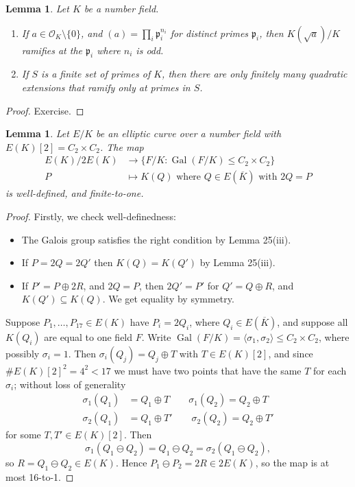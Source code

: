 \documentclass[a4paper]{article}
\theoremstyle{plain}
\newtheorem{lemma}[theorem]{Lemma}
\theoremstyle{remark}
\theoremstyle{definition}
\DeclareMathOperator{\Gal}{Gal}
\newcommand{\p}{\mathfrak{p}}
\renewcommand{\O}{\mathcal{O}}
\begin{document}
\begin{lemma}
    Let $K$ be a number field.
    \begin{enumerate}[label=(\roman*)]
        \item If $a\in\O_K\setminus\{0\}$, and $(a)=\prod_i\p_i^{n_i}$ for
            distinct primes $\p_i$, then $K(\sqrt a)/K$ ramifies at the $\p_i$
            where $n_i$ is odd.

        \item If $S$ is a finite set of primes of $K$, then there are only
            finitely many quadratic extensions that ramify only at primes in
            $S$.
    \end{enumerate}
\end{lemma}

\begin{proof}
    Exercise.
\end{proof}

\begin{lemma}
    Let $E/K$ be an elliptic curve over a number field with
    $E(K)[2]=C_2\times C_2$. The map
    \begin{align*}
        E(K)/2E(K) &\to \{F/K:\Gal(F/K)\le C_2\times C_2\} \\
        P &\mapsto \text{$K(Q)$ where $Q\in E(\overline K)$ with $2Q=P$}
    \end{align*}
    is well-defined, and finite-to-one.
\end{lemma}

\begin{proof}
    Firstly, we check well-definedness:
    \begin{itemize}
        \item The Galois group satisfies the right condition by Lemma 25(iii).
        \item If $P=2Q=2Q'$ then $K(Q)=K(Q')$ by Lemma 25(iii).
        \item If $P'=P\oplus 2R$, and $2Q=P$, then $2Q'=P'$ for $Q'=Q\oplus R$,
            and $K(Q')\subseteq K(Q)$. We get equality by symmetry.
    \end{itemize}
    Suppose $P_1,\ldots,P_{17}\in E(K)$ have $P_i=2Q_i$, where
    $Q_i\in E(\overline K)$, and suppose all $K(Q_i)$ are equal to one field
    $F$. Write $\Gal(F/K)=\langle\sigma_1,\sigma_2\rangle\le C_2\times C_2$,
    where possibly $\sigma_i=1$. Then $\sigma_i(Q_j)=Q_j\oplus T$ with
    $T\in E(K)[2]$, and since $\#E(K)[2]^2=4^2<17$ we must have two points that
    have the same $T$ for each $\sigma_i$; without loss of generality
    \begin{align*}
        \sigma_1(Q_1) &= Q_1\oplus T \qquad \sigma_1(Q_2) = Q_2\oplus T \\
        \sigma_2(Q_1) &= Q_1\oplus T' \qquad \sigma_2(Q_2) = Q_2\oplus T'
    \end{align*}
    for some $T,T'\in E(K)[2]$. Then
    \begin{equation*}
        \sigma_1(Q_1\ominus Q_2) = Q_1\ominus Q_2 = \sigma_2(Q_1\ominus Q_2),
    \end{equation*}
    so $R=Q_1\ominus Q_2\in E(K)$. Hence $P_1\ominus P_2=2R\in 2E(K)$, so the
    map is at most 16-to-1.
\end{proof}
\end{document}
